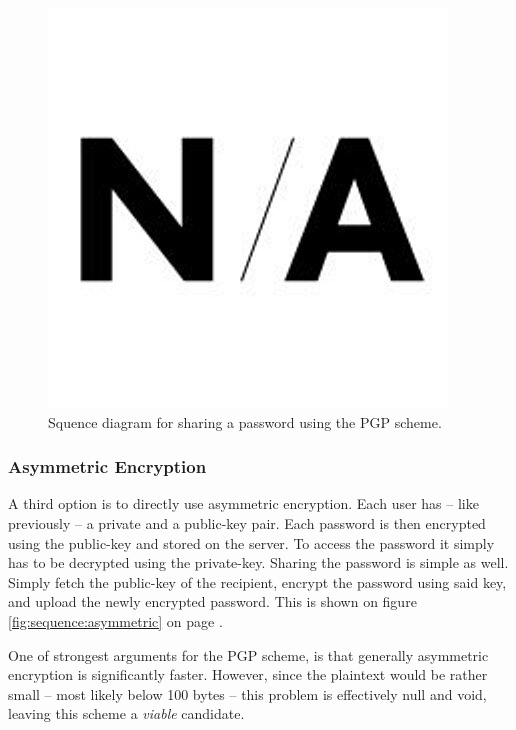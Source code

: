 				\begin{figure}[h!]
					\centering
					\includegraphics[width=\textwidth]{figures/design/na.png}
					\caption{Squence diagram for sharing a password using the PGP scheme.}
					\label{fig:sequence:pgp}
				\end{figure}

			\subsubsection{Asymmetric Encryption}
				\label{sec:assymetric}
				A third option is to directly use asymmetric encryption. Each user has -- like previously -- a private and a public-key pair. Each password is then encrypted using the public-key and stored on the server. To access the password it simply has to be decrypted using the private-key. Sharing the password is simple as well. Simply fetch the public-key of the recipient, encrypt the password using said key, and upload the newly encrypted password. This is shown on figure \ref{fig:sequence:asymmetric} on page \pageref{fig:sequence:asymmetric}.

				One of strongest arguments for the PGP scheme, is that generally asymmetric encryption is significantly faster. However, since the plaintext would be rather small -- most likely below 100 bytes -- this problem is effectively null and void, leaving this scheme a \emph{viable} candidate.

